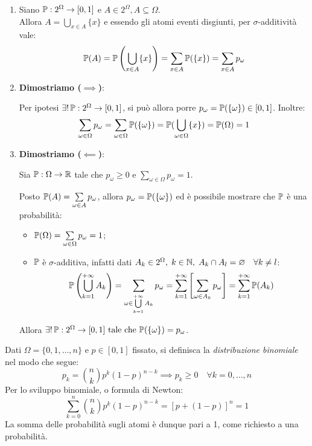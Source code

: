 \begin{dimo}
  \Fixvmode
  \begin{enumerate}
    \item Siano $\mathbb P:2^\Omega \to [0,1]$ e $A \in 2^\Omega, A \subseteq \Omega$. \\
  Allora $A = \bigcup\limits_{x \in A} \{x\}$ e essendo gli atomi eventi disgiunti, per $\sigma$-additività vale:
      $$\mathbb P(A)  = \mathbb P\left( \bigcup\limits_{x \in A} \{x\} \right) = \sum\limits_{x \in A} \mathbb P( \{x\}) = \sum\limits_{x \in A} p_\omega$$
    \item \textbf{Dimostriamo ($\implies$)}:

      Per ipotesi $\exists! \, \mathbb P:2^\Omega \to [0,1]$, si può allora porre $p_\omega = \mathbb P(\{\omega\}) \in [0,1]$. Inoltre:
      $$\sum\limits_{\omega \in \Omega} p_\omega = \sum\limits_{\omega \in \Omega} \mathbb P(\{\omega\}) = \mathbb P(\bigcup\limits_{\omega \in \Omega} \{x\}) = \mathbb P(\Omega) = 1$$
    \item[] \textbf{Dimostriamo ($\impliedby$)}:

      Sia $\mathbb P:\Omega \to \mathbb R$ tale che $p_\omega \geq 0$ e  $\sum\limits_{\omega \in \Omega} p_\omega = 1$.

      Posto $\mathbb P(A) = \sum\limits_{\omega \in A} p_\omega$, allora $p_\omega = \mathbb P(\{\omega\})$ ed è possibile mostrare che $\mathbb P$ è una probabilità:
      \begin{itemize}
        \item $\mathbb P(\Omega) = \sum\limits_{\omega \in \Omega} p_\omega = 1$;
        \item $\mathbb P$ è $\sigma$-additiva, infatti dati $A_k \in 2^\Omega, \; k \in \mathbb N, \; A_k \cap A_l = \varnothing \quad \forall k \neq l$:
          $$\mathbb P\left( \bigcup\limits_{k=1}^{+\infty} A_k \right)
          = \sum\limits_{\omega \in \bigcup\limits_{k=1}^{+\infty} A_k} p_\omega
          = \sum\limits_{k=1}^{+\infty} \left[\sum\limits_{\omega \in A_k} p_\omega \right]
          = \sum\limits_{k=1}^{+\infty} \mathbb P(A_k)$$
      \end{itemize}
    Allora $\exists! \, \mathbb P:2^\Omega \to [0,1] \text{ tale che } \mathbb P(\{\omega\}) = p_\omega$. \qedhere
  \end{enumerate}
\end{dimo}

\bigskip
\begin{ese}
  Dati $\Omega = \{0, 1, \dots, n\}$ e $p \in [0,1]$ fissato, si definisca la \emph{distribuzione binomiale} nel modo che segue:
  $$p_k = \binom{n}{k}p^k(1-p)^{n-k} \implies p_k \geq 0 \quad \forall k = 0, \dots, n$$
  Per lo sviluppo binomiale, o formula di Newton:
  $$\sum\limits_{k=0}^{n} \binom{n}{k}p^k (1-p)^{n-k} = [p + (1-p)]^n = 1$$
  La somma delle probabilità sugli atomi è dunque pari a 1, come richiesto a una probabilità.
\end{ese}

